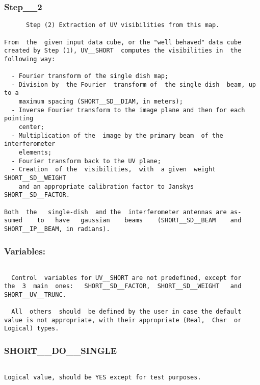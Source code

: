 \subsubsection{Step\_\_2}
\begin{verbatim}
      Step (2) Extraction of UV visibilities from this map.

From  the  given input data cube, or the "well behaved" data cube
created by Step (1), UV__SHORT  computes the visibilities in  the
following way:

  - Fourier transform of the single dish map;
  - Division by  the Fourier  transform of  the single dish  beam, up  to a
    maximum spacing (SHORT__SD__DIAM, in meters);
  - Inverse Fourier transform to the image plane and then for each pointing
    center;
  - Multiplication of the  image by the primary beam  of the interferometer
    elements;
  - Fourier transform back to the UV plane;
  - Creation  of the  visibilities,  with  a given  weight  SHORT__SD__WEIGHT
    and an appropriate calibration factor to Janskys SHORT__SD__FACTOR.

Both  the   single-dish  and the  interferometer antennas are as-
sumed    to   have   gaussian    beams    (SHORT__SD__BEAM    and
SHORT__IP__BEAM, in radians).

\end{verbatim}
\subsubsection{Variables:}
\begin{verbatim}

  Control  variables for UV__SHORT are not predefined, except for
the  3  main  ones:   SHORT__SD__FACTOR,  SHORT__SD__WEIGHT   and
SHORT__UV__TRUNC.

  All  others  should  be defined by the user in case the default
value is not appropriate, with their appropriate (Real,  Char  or
Logical) types.

\end{verbatim}
\subsubsection{SHORT\_\_DO\_\_SINGLE}
\begin{verbatim}

Logical value, should be YES except for test purposes.

\end{verbatim}
